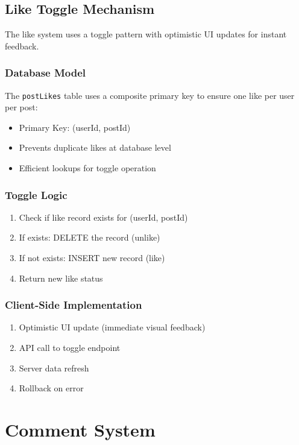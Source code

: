 \documentclass[12pt,a4paper]{report}
\begin{document}
\subsection{Like Toggle Mechanism}

The like system uses a toggle pattern with optimistic UI updates for instant feedback.

\subsubsection{Database Model}

The \texttt{postLikes} table uses a composite primary key to ensure one like per user per post:

\begin{itemize}
    \item Primary Key: (userId, postId)
    \item Prevents duplicate likes at database level
    \item Efficient lookups for toggle operation
\end{itemize}

\subsubsection{Toggle Logic}

\begin{enumerate}
    \item Check if like record exists for (userId, postId)
    \item If exists: DELETE the record (unlike)
    \item If not exists: INSERT new record (like)
    \item Return new like status
\end{enumerate}

\subsubsection{Client-Side Implementation}

\begin{enumerate}
    \item Optimistic UI update (immediate visual feedback)
    \item API call to toggle endpoint
    \item Server data refresh
    \item Rollback on error
\end{enumerate}

\section{Comment System}
\end{document}
